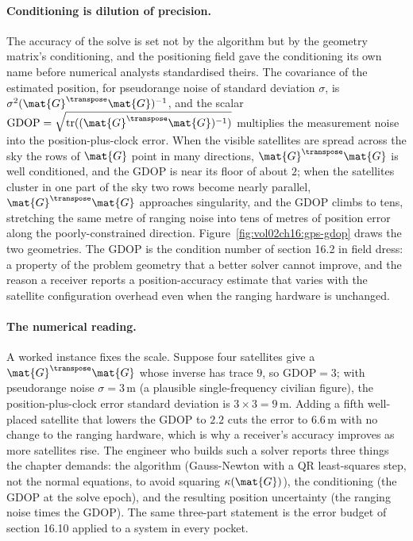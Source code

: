 \paragraph{Conditioning is dilution of precision.}
The accuracy of the solve is set not by the algorithm but by the geometry
matrix's conditioning, and the positioning field gave the conditioning its own
name before numerical analysts standardised theirs. The covariance of the
estimated position, for pseudorange noise of standard deviation $\sigma$, is
$\sigma^{2}(\mat{G}^{\transpose}\mat{G})^{-1}$, and the scalar
 $\mathrm{GDOP} = \sqrt{\operatorname{tr}
((\mat{G}^{\transpose}\mat{G})^{-1})}$ multiplies the measurement noise into the
position-plus-clock error. When the visible satellites are spread across the
sky the rows of $\mat{G}$ point in many directions, $\mat{G}^{\transpose}
\mat{G}$ is well conditioned, and the GDOP is near its floor of about $2$; when
the satellites cluster in one part of the sky two rows become nearly parallel,
$\mat{G}^{\transpose}\mat{G}$ approaches singularity, and the GDOP climbs to
tens, stretching the same metre of ranging noise into tens of metres of
position error along the poorly-constrained direction.
Figure~\ref{fig:vol02ch16:gps-gdop} draws the two geometries. The GDOP is the
condition number of section 16.2 in field dress: a property of the problem
geometry that a better solver cannot improve, and the reason a receiver reports
a position-accuracy estimate that varies with the satellite configuration
overhead even when the ranging hardware is unchanged.



\paragraph{The numerical reading.}
A worked instance fixes the scale. Suppose four satellites give a
$\mat{G}^{\transpose}\mat{G}$ whose inverse has trace $9$, so $\mathrm{GDOP} =
3$; with pseudorange noise $\sigma = 3\,\text{m}$ (a plausible single-frequency
civilian figure), the position-plus-clock error standard deviation is $3 \times
3 = 9\,\text{m}$. Adding a fifth well-placed satellite that lowers the GDOP to
$2.2$ cuts the error to $6.6\,\text{m}$ with no change to the ranging hardware,
which is why a receiver's accuracy improves as more satellites rise. The
engineer who builds such a solver reports three things the chapter demands: the
algorithm (Gauss-Newton with a QR least-squares step, not the normal equations,
to avoid squaring $\kappa(\mat{G})$), the conditioning (the GDOP at the solve
epoch), and the resulting position uncertainty (the ranging noise times the
GDOP). The same three-part statement is the error budget of section 16.10
applied to a system in every pocket.

